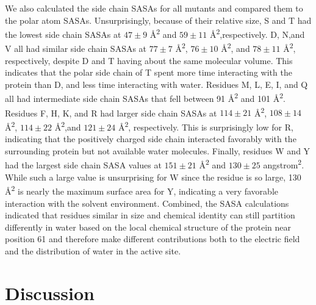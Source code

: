 We also calculated the side chain SASAs for all mutants and compared them to the polar atom SASAs. 
Unsurprisingly, because of their relative size, S and T had the lowest side chain SASAs at $47 \pm 9$ \si{\angstrom^2} and $59 \pm 11$ \si{\angstrom^2},respectively. 
D, N,and V all had similar side chain SASAs at $77 \pm 7$ \si{\angstrom^2}, $76 \pm 10$ \si{\angstrom^2}, and $78 \pm 11$ \si{\angstrom^2}, respectively, despite D and T having about the same molecular volume.
This indicates that the polar side chain of T spent more time interacting with the protein than D, and less time interacting with water. 
Residues M, L, E, I, and Q all had intermediate side chain SASAs that fell between 91 \si{\angstrom^2} and 101 \si{\angstrom^2}. 
Residues F, H, K, and R had larger side chain SASAs at $114 \pm 21$ \si{\angstrom^2}, $108 \pm 14$ \si{\angstrom^2}, $114 \pm 22$ \si{\angstrom^2},and $121 \pm 24$ \si{\angstrom^2}, respectively. 
This is surprisingly low for R, indicating that the positively charged side chain interacted favorably with the surrounding protein but not available water molecules.
Finally, residues W and Y had the largest side chain SASA values at $151 \pm 21$ \si{\angstrom^2} and $130 \pm 25$ \si{angstrom^2}. 
While such a large value is unsurprising for W since the residue is so large, 130 \si{\angstrom^2} is nearly the maximum surface area for Y, indicating a very favorable interaction with the solvent environment. 
Combined, the SASA calculations indicated that residues similar in size and chemical identity can still partition differently in water based on the local chemical structure of the protein near position 61 and therefore make different contributions both to the electric field and the distribution of water in the active site. 

\section{Discussion}\label{pKa-discussion}

